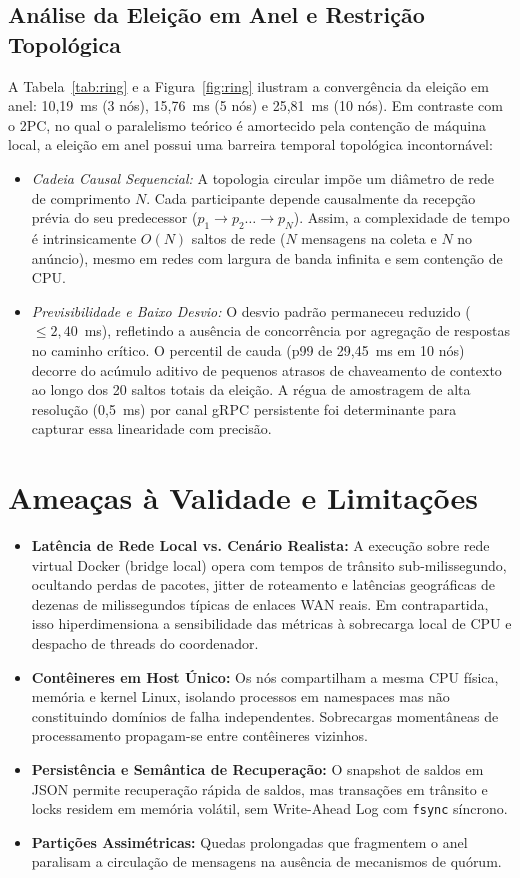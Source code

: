 \documentclass[conference]{IEEEtran}
\begin{document}
\subsection{Análise da Eleição em Anel e Restrição Topológica}
A Tabela~\ref{tab:ring} e a Figura~\ref{fig:ring} ilustram a convergência da eleição em anel: 10,19~ms (3 nós), 15,76~ms (5 nós) e 25,81~ms (10 nós). Em contraste com o 2PC, no qual o paralelismo teórico é amortecido pela contenção de máquina local, a eleição em anel possui uma barreira temporal topológica incontornável:
\begin{itemize}
  \item \textit{Cadeia Causal Sequencial:} A topologia circular impõe um diâmetro de rede de comprimento $N$. Cada participante depende causalmente da recepção prévia do seu predecessor ($p_1 \to p_2 \dots \to p_N$). Assim, a complexidade de tempo é intrinsicamente $O(N)$ saltos de rede ($N$ mensagens na coleta e $N$ no anúncio), mesmo em redes com largura de banda infinita e sem contenção de CPU.
  \item \textit{Previsibilidade e Baixo Desvio:} O desvio padrão permaneceu reduzido ($\le 2,40$~ms), refletindo a ausência de concorrência por agregação de respostas no caminho crítico. O percentil de cauda (p99 de 29,45~ms em 10 nós) decorre do acúmulo aditivo de pequenos atrasos de chaveamento de contexto ao longo dos 20 saltos totais da eleição. A régua de amostragem de alta resolução (0,5~ms) por canal gRPC persistente foi determinante para capturar essa linearidade com precisão.
\end{itemize}

\section{Ameaças à Validade e Limitações}
\begin{itemize}
  \item \textbf{Latência de Rede Local vs. Cenário Realista:} A execução sobre rede virtual Docker (bridge local) opera com tempos de trânsito sub-milissegundo, ocultando perdas de pacotes, jitter de roteamento e latências geográficas de dezenas de milissegundos típicas de enlaces WAN reais. Em contrapartida, isso hiperdimensiona a sensibilidade das métricas à sobrecarga local de CPU e despacho de threads do coordenador.
  \item \textbf{Contêineres em Host Único:} Os nós compartilham a mesma CPU física, memória e kernel Linux, isolando processos em namespaces mas não constituindo domínios de falha independentes. Sobrecargas momentâneas de processamento propagam-se entre contêineres vizinhos.
  \item \textbf{Persistência e Semântica de Recuperação:} O snapshot de saldos em JSON permite recuperação rápida de saldos, mas transações em trânsito e locks residem em memória volátil, sem Write-Ahead Log com \texttt{fsync} síncrono.
  \item \textbf{Partições Assimétricas:} Quedas prolongadas que fragmentem o anel paralisam a circulação de mensagens na ausência de mecanismos de quórum.
\end{itemize}
\end{document}
